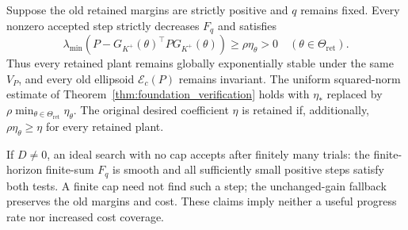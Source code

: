 \begin{theorem}
\label{thm:stage2_certified_descent}
Suppose the old retained margins are strictly positive and $q$ remains
fixed. Every nonzero accepted step strictly decreases $F_q$ and satisfies
\begin{equation}
\label{eq:stage2_preserved_margin}
 \lambda_{\min}(P-G_{K^+}(\theta)^\top PG_{K^+}(\theta))
 \ge\rho\eta_\theta>0
 \quad(\theta\in\Theta_{\mathrm{ret}}).
\end{equation}
Thus every retained plant remains globally exponentially stable under
the same $V_P$, and every old ellipsoid $\mathcal E_c(P)$ remains invariant.
The uniform squared-norm estimate of
Theorem~\ref{thm:foundation_verification} holds with
$\eta_*$ replaced by $\rho\min_{\theta\in\Theta_{\mathrm{ret}}}\eta_\theta$.
The original desired coefficient $\eta$ is retained if, additionally,
$\rho\eta_\theta\ge\eta$ for every retained plant.

If $D\ne0$, an ideal search with no cap accepts after finitely many trials:
the finite-horizon finite-sum $F_q$ is smooth and all sufficiently small
positive steps satisfy both tests. A finite cap need not find such a step;
the unchanged-gain fallback preserves the old margins and cost. These
claims imply neither a useful progress rate nor increased cost coverage.
\end{theorem}

